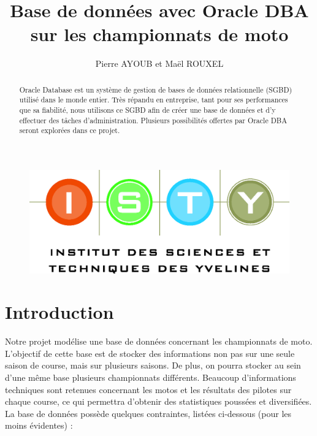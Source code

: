 \documentclass[12pt,a4paper]{article}
\begin{document}
\title{Base de données avec Oracle DBA sur les championnats de moto}
\author{Pierre AYOUB et Maël ROUXEL}

\maketitle

\begin{figure}[b]
    \centering
    \includegraphics[scale=0.3]{figures/isty.jpg}
\end{figure}

\newpage
\begin{abstract}
    
Oracle Database est un système de gestion de bases de données relationnelle
(SGBD) utilisé dans le monde entier. Très répandu en entreprise, tant pour
ses performances que sa fiabilité, nous utilisons ce SGBD afin de créer une
base de données et d’y effectuer des tâches d’administration. Plusieurs
possibilités offertes par Oracle DBA seront explorées dans ce projet.
    
\end{abstract}

\tableofcontents

\section{Introduction}
\label{sec.intro}

Notre projet modélise une base de données concernant les championnats de moto.
L’objectif de cette base est de stocker des informations non pas sur une seule
saison de course, mais sur plusieurs saisons. De plus, on pourra stocker au sein
d’une même base plusieurs championnats différents. Beaucoup d'informations
techniques sont retenues concernant les motos et les résultats des pilotes sur
chaque course, ce qui permettra d’obtenir des statistiques poussées et
diversifiées. La base de données possède quelques contraintes, listées
ci-dessous (pour les moins évidentes) :
\end{document}
